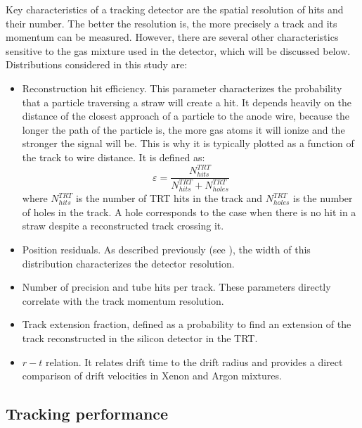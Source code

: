 Key characteristics of a tracking detector are the spatial resolution of hits and their number. 
The better the resolution is, the more precisely a track and its momentum can be measured.
However, there are several other characteristics sensitive to the gas mixture used in the detector, which will be discussed below.
Distributions considered in this study are:
\begin{itemize}
 \item Reconstruction hit efficiency. This parameter characterizes the probability that a particle traversing a straw will create a hit.
 It depends heavily on the distance of the closest approach of a particle to the anode wire, because the longer the path of the particle is, the more gas atoms it will ionize and the stronger the signal will be. This is why it is typically plotted as a function of the track to wire distance. It is defined as:
 \begin{equation}
  \varepsilon = \dfrac{N^{TRT}_{hits}}{N^{TRT}_{hits} + N^{TRT}_{holes}}
 \label{eq:hit_eff}
 \end{equation}
 where $N^{TRT}_{hits}$ is the number of TRT hits in the track and $N^{TRT}_{holes}$ is the number of holes in the track. A hole corresponds to the case when there is no hit in a straw
 despite a reconstructed track crossing it.
 \item Position residuals. As described previously (see ), the width of this distribution characterizes the detector resolution.
 \item Number of precision and tube hits per track. These parameters directly correlate with the track momentum resolution.
 \item Track extension fraction, defined as a probability to find an extension of the track reconstructed in the silicon detector in the TRT.
 \item $r-t$ relation. It relates drift time to the drift radius and provides a direct comparison of drift velocities in Xenon and Argon mixtures.
\end{itemize}


\subsection{Tracking performance}
\label{subsec:TRT:trackPerf}

